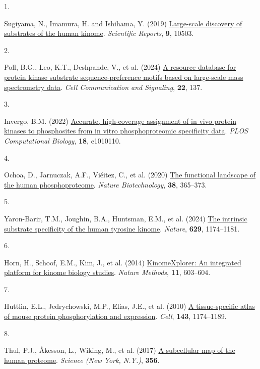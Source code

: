 \documentclass[
]{article}
\newlength{\cslhangindent}
\newlength{\csllabelwidth}
\newenvironment{CSLReferences}[2] %
 {\begin{list}{}{%
  \setlength{\itemindent}{0pt}
  \setlength{\leftmargin}{0pt}
  \setlength{\parsep}{0pt}
  \ifodd #1
   \setlength{\leftmargin}{\cslhangindent}
   \setlength{\itemindent}{-1\cslhangindent}
  \fi
  \setlength{\itemsep}{#2\baselineskip}}}
 {\end{list}}
\newcommand{\CSLLeftMargin}[1]{\parbox[t]{\csllabelwidth}{\strut#1\strut}}
\newcommand{\CSLRightInline}[1]{\parbox[t]{\linewidth - \csllabelwidth}{\strut#1\strut}}
\begin{document}
\protect{}\label{refs}
\begin{CSLReferences}{0}{0}
\CSLLeftMargin{1. }%
\CSLRightInline{Sugiyama, N., Imamura, H. and Ishihama, Y. (2019)
\href{https://doi.org/10.1038/s41598-019-46385-4}{Large-scale discovery
of substrates of the human kinome}. \emph{Scientific Reports},
\textbf{9}, 10503.}

\CSLLeftMargin{2. }%
\CSLRightInline{Poll, B.G., Leo, K.T., Deshpande, V., et al. (2024)
\href{https://doi.org/10.1186/s12964-023-01436-2}{A resource database
for protein kinase substrate sequence-preference motifs based on
large-scale mass spectrometry data}. \emph{Cell Communication and
Signaling}, \textbf{22}, 137.}

\CSLLeftMargin{3. }%
\CSLRightInline{Invergo, B.M. (2022)
\href{https://doi.org/10.1371/journal.pcbi.1010110}{Accurate,
high-coverage assignment of in vivo protein kinases to phosphosites from
in vitro phosphoproteomic specificity data}. \emph{PLOS Computational
Biology}, \textbf{18}, e1010110.}

\CSLLeftMargin{4. }%
\CSLRightInline{{Ochoa, D., Jarnuczak, A.F., Viéitez, C., et al.} (2020)
\href{https://doi.org/10.1038/s41587-019-0344-3}{The functional
landscape of the human phosphoproteome}. \emph{Nature Biotechnology},
\textbf{38}, 365--373.}

\CSLLeftMargin{5. }%
\CSLRightInline{Yaron-Barir, T.M., Joughin, B.A., Huntsman, E.M., et al.
(2024) \href{https://doi.org/10.1038/s41586-024-07407-y}{The intrinsic
substrate specificity of the human tyrosine kinome}. \emph{Nature},
\textbf{629}, 1174--1181.}

\CSLLeftMargin{6. }%
\CSLRightInline{Horn, H., Schoof, E.M., Kim, J., et al. (2014)
\href{https://doi.org/10.1038/nmeth.2968}{{KinomeXplorer}: An integrated
platform for kinome biology studies}. \emph{Nature Methods},
\textbf{11}, 603--604.}

\CSLLeftMargin{7. }%
\CSLRightInline{Huttlin, E.L., Jedrychowski, M.P., Elias, J.E., et al.
(2010) \href{https://doi.org/10.1016/j.cell.2010.12.001}{A
tissue-specific atlas of mouse protein phosphorylation and expression}.
\emph{Cell}, \textbf{143}, 1174--1189.}

\CSLLeftMargin{8. }%
\CSLRightInline{Thul, P.J., Åkesson, L., Wiking, M., et al. (2017)
\href{https://doi.org/10.1126/science.aal3321}{A subcellular map of the
human proteome}. \emph{Science (New York, N.Y.)}, \textbf{356}.}


\end{CSLReferences}
\end{document}
